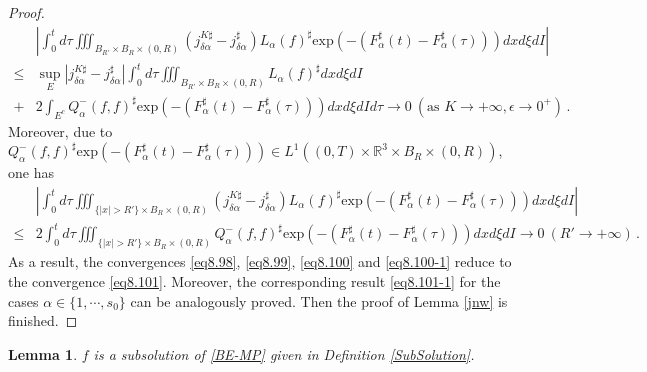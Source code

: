 \documentclass[reqno,11pt]{amsart}
\newtheorem{lemma}{Lemma}[section]
\numberwithin{equation}{section}
\def\R{\mathbb{R}}
\def\exp{\mathrm{exp}}
\begin{document}
\begin{proof}
\begin{equation}\label{eq8.100}
	\begin{aligned}
		&|\int_{0}^{t} d \tau \iiint_{ B_{R'} \times B_R \times (0,R)} (j^{K\sharp}_{\delta \alpha }-j^{\sharp}_{\delta \alpha }) L_\alpha (f)^\sharp \exp(-(F^\sharp _{\alpha } (t)- F^\sharp _{\alpha } (\tau))) dxd\xi dI |\\
		\leq & \sup \limits_{E} |j^{K\sharp}_{\delta \alpha }-j^{\sharp}_{\delta \alpha }| \int_{0}^{t} d \tau \iiint_{ B_{R'} \times B_R \times (0,R)} L_\alpha (f)^\sharp dxd\xi dI \\
		+ & 2 \int_{E^c} Q^-_\alpha (f,f)^\sharp \exp(-(F^\sharp _{\alpha } (t)- F^\sharp _{\alpha } (\tau))) dxd\xi dI d \tau \rightarrow 0 \ (\text{as } K \rightarrow +\infty, \epsilon \rightarrow 0^+ ) \,.
	\end{aligned}
\end{equation}
Moreover, due to $Q^-_\alpha (f,f)^\sharp \exp(-(F^\sharp _{\alpha } (t)- F^\sharp _{\alpha } (\tau))) \in L^1 ( (0, T) \times \R^3 \times B_R \times (0, R) )$, one has
\begin{equation}\label{eq8.100-1}
  \begin{aligned}
    &|\int_{0}^{t} d \tau \iiint_{ \{  |x| > R' \} \times B_R \times (0,R)} (j^{K\sharp}_{\delta \alpha }-j^{\sharp}_{\delta \alpha }) L_\alpha (f)^\sharp \exp(-(F^\sharp _{\alpha } (t)- F^\sharp _{\alpha } (\tau))) dxd\xi dI |\\
    \leq & 2 \int_{0}^{t} d \tau \iiint_{ \{  |x| > R' \} \times B_R \times (0,R)} Q^-_\alpha (f,f)^\sharp \exp(-(F^\sharp _{\alpha } (t)- F^\sharp _{\alpha } (\tau))) dxd\xi dI \rightarrow 0 \ (R' \to + \infty) \,.
  \end{aligned}
\end{equation}
As a result, the convergences \eqref{eq8.98}, \eqref{eq8.99}, \eqref{eq8.100} and \eqref{eq8.100-1} reduce to the convergence \eqref{eq8.101}. Moreover, the corresponding result \eqref{eq8.101-1} for the cases $\alpha \in \{1,\cdots,s_0\}$ can be analogously proved. Then the proof of Lemma \ref{jnw} is finished.
\end{proof}


\begin{lemma}\label{subsolution}
$f$ is a subsolution of \eqref{BE-MP} given in Definition \ref{SubSolution}.
\end{lemma}
\end{document}
